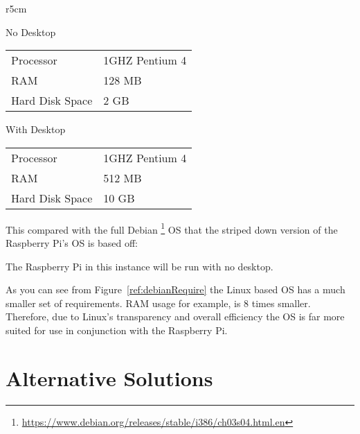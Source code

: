 \begin{wrapfigure}{r}{5cm}
\begin{center}
No Desktop\\
\begin{tabular}{| l | l |}
	\hline
	Processor & 1GHZ Pentium 4 \\
	RAM & 128 MB \\
	Hard Disk Space & 2 GB \\
	\hline
\end{tabular}

\vspace{2.5mm}

With Desktop\\
\begin{tabular}{| l | l |}
	\hline
	Processor & 1GHZ Pentium 4 \\
	RAM & 512 MB \\
	Hard Disk Space & 10 GB \\
	\hline
\end{tabular}
\caption{Debian system requirements}
\label{ref:debianRequire}
\end{center}
\end{wrapfigure}

This compared with the full Debian \footnote{\url{https://www.debian.org/releases/stable/i386/ch03s04.html.en}} OS that the striped down version of the Raspberry Pi's OS is based off:

The Raspberry Pi in this instance will be run with no desktop.

As you can see from Figure~\ref{ref:debianRequire} the Linux based OS has a much smaller set of requirements. RAM usage for example, is 8 times smaller. Therefore, due to Linux's transparency and overall efficiency the OS is far more suited for use in conjunction with the Raspberry Pi. 

\clearpage
\section{Alternative Solutions}
